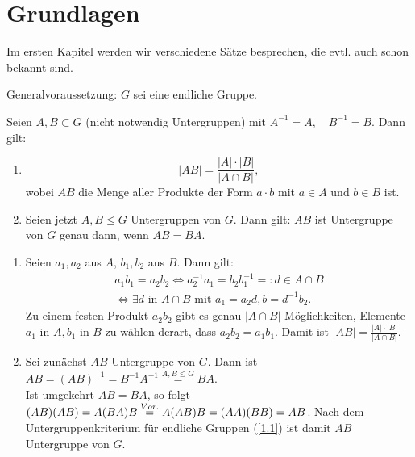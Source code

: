 \section{Grundlagen}
Im ersten Kapitel werden wir verschiedene S\"atze besprechen, die evtl. auch schon bekannt sind.

Generalvoraussetzung: $G$ sei eine endliche Gruppe.

\begin{lemma}\label{1.1}\label{untergruppenkriterium}
 Seien $A, B \subset G$ (nicht notwendig Untergruppen) mit $A^{-1} = A,\quad B^{-1}=B$. Dann gilt:
 \begin{enumerate}
 \item $$|AB| = \frac{|A|\cdot |B|}{|A\cap B|},$$
  wobei $AB$ die Menge aller Produkte der Form $a\cdot b$ mit $a \in A$ und $b \in B$ ist.
 \item Seien jetzt $A, B \leq G$ Untergruppen von $G$. Dann gilt:
  $AB$ ist Untergruppe von $G$ genau dann, wenn $AB=BA$.
\end{enumerate}

\end{lemma}
\begin{beweis} \spspace
 \begin{enumerate}
 \item Seien $a_1,a_2$ aus $A$, $b_1,b_2$ aus $B$. Dann gilt:
  \begin{eqnarray*}a_{1}b_{1}=a_{2}b_{2} \Leftrightarrow a_{2}^{-1} a_1=b_2b_{1}^{-1} =:d \in A\cap B \\\Leftrightarrow \exists d \textrm{ in } A\cap B \textrm{ mit } a_1=a_2d, b=d^{-1}b_2.
  \end{eqnarray*}
  Zu einem festen Produkt $a_2b_2$ gibt es genau $|A\cap B|$ M\"oglichkeiten, Elemente $a_1 \textrm{ in } A, b_1 \textrm{ in } B$ zu w\"ahlen derart, dass $a_2b_2 = a_1b_1$. Damit ist $|AB|=\frac{|A|\cdot |B|}{|A\cap B|}$.
 \item Sei zun\"achst $AB$  Untergruppe von $G$. Dann ist $AB=(AB)^{-1}=B^{-1}A^{-1}\stackrel{A,B \leq G}{=}BA$.\\
Ist umgekehrt $AB=BA$, so folgt $(AB)(AB)=A(BA)B\stackrel{Vor.}{=}A(AB)B\\=(AA)(BB)=AB$. Nach dem Untergruppenkriterium f\"ur endliche Gruppen (\ref{1.1}) ist damit $AB$ Untergruppe von $G$.
\end{enumerate}

\end{beweis}


